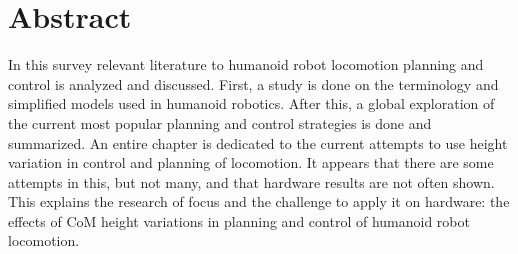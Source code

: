 %
\chapter*{Abstract}%

In this survey relevant literature to humanoid robot locomotion planning and control is analyzed and discussed. First, a  study is done on the terminology and simplified models used in humanoid robotics. After this, a global exploration of the current most popular planning and control strategies is done and summarized. An entire chapter is dedicated to the current attempts to use height variation in control and planning of locomotion. It appears that there are some attempts in this, but not many, and that hardware results are not often shown. This explains the research of focus and the challenge to apply it on hardware: the effects of \ac{CoM} height variations in planning and control of humanoid robot locomotion.
